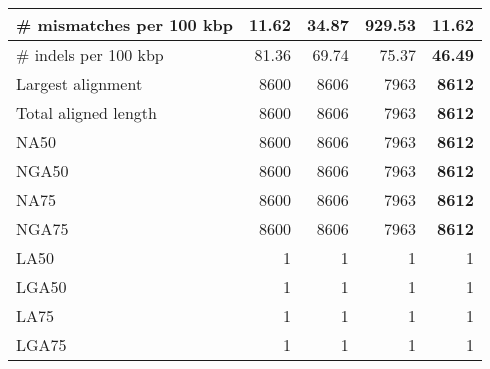 \documentclass[12pt,a4paper]{article}
\begin{document}
\begin{table}[ht]
\begin{center}
\begin{tabular}{|l*{4}{|r}|}
\# mismatches per 100 kbp & {\bf 11.62} & 34.87 & 929.53 & {\bf 11.62} \\ \hline
\# indels per 100 kbp & 81.36 & 69.74 & 75.37 & {\bf 46.49} \\ \hline
Largest alignment & 8600 & 8606 & 7963 & {\bf 8612} \\ \hline
Total aligned length & 8600 & 8606 & 7963 & {\bf 8612} \\ \hline
NA50 & 8600 & 8606 & 7963 & {\bf 8612} \\ \hline
NGA50 & 8600 & 8606 & 7963 & {\bf 8612} \\ \hline
NA75 & 8600 & 8606 & 7963 & {\bf 8612} \\ \hline
NGA75 & 8600 & 8606 & 7963 & {\bf 8612} \\ \hline
LA50 & 1 & 1 & 1 & 1 \\ \hline
LGA50 & 1 & 1 & 1 & 1 \\ \hline
LA75 & 1 & 1 & 1 & 1 \\ \hline
LGA75 & 1 & 1 & 1 & 1 \\ \hline
\end{tabular}
\end{center}
\end{table}
\end{document}
